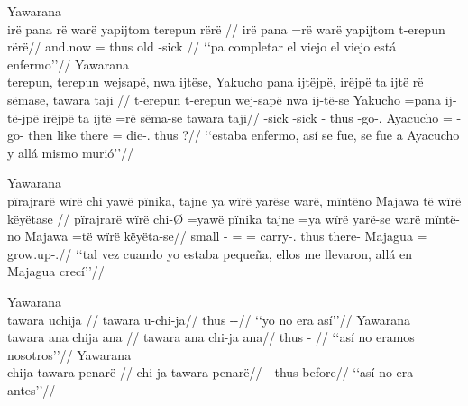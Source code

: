 \documentclass{memoir}
\begin{document}
\pex\label{temp-main-aff-npred-nsubj}    \a Yawarana\\
    \label{desccasmaj-85}        \begingl
        \glpreamble irë pana rë warë yapijtom terepun rërë //
        \gla irë pana =rë warë yapijtom t-erepun rërë//
        \glb and.now = thus old -sick //
            \glft ‘‘pa completar el viejo el viejo está enfermo’’//  
        \endgl 
    \a Yawarana\\
    \label{conv1stenc-99}        \begingl
        \glpreamble terepun, terepun wejsapë, nwa ijtëse, Yakucho pana ijtëjpë, irëjpë ta ijtë rë sëmase, tawara taji //
        \gla t-erepun t-erepun wej-sapë nwa ij-të-se Yakucho =pana ij-të-jpë irëjpë ta ijtë =rë sëma-se tawara taji//
        \glb {}-sick -sick - thus -go-. Ayacucho = -go- then like there = die-. thus ?//
            \glft ‘‘estaba enfermo, así se fue, se fue a Ayacucho y allá mismo murió’’//  
        \endgl 
\xe

\ex Yawarana \\
\label{temp-sub-aff-npred-nsubj-cop}    \begingl
    \glpreamble pïrajrarë wïrë chi yawë pïnika, tajne ya wïrë yarëse warë, mïntëno Majawa të wïrë këyëtase //
    \gla pïrajrarë wïrë chi-Ø =yawë pïnika tajne =ya wïrë yarë-se warë mïntë-no Majawa =të wïrë këyëta-se//
    \glb small  - =   =  carry-. thus there- Majagua =  grow.up-.//
        \glft ‘‘tal vez cuando yo estaba pequeña, ellos me llevaron, allá en Majagua crecí’’//  
    \endgl 
\xe

\pex\label{temp-main-neg-advpred-cop-neg-nsubj}    \a Yawarana\\
    \label{descmensgrme-43}        \begingl
        \glpreamble tawara uchija //
        \gla tawara u-chi-ja//
        \glb thus --//
            \glft ‘‘yo no era así’’//  
        \endgl 
    \a Yawarana\\
    \label{histyarirdi-248}        \begingl
        \glpreamble tawara ana chija ana //
        \gla tawara ana chi-ja ana//
        \glb thus  - //
            \glft ‘‘así no eramos nosotros’’//  
        \endgl 
    \a Yawarana\\
    \label{histyarirdi-249}        \begingl
        \glpreamble chija tawara penarë //
        \gla chi-ja tawara penarë//
        \glb {}- thus before//
            \glft ‘‘así no era antes’’//  
        \endgl 
\xe
\end{document}
